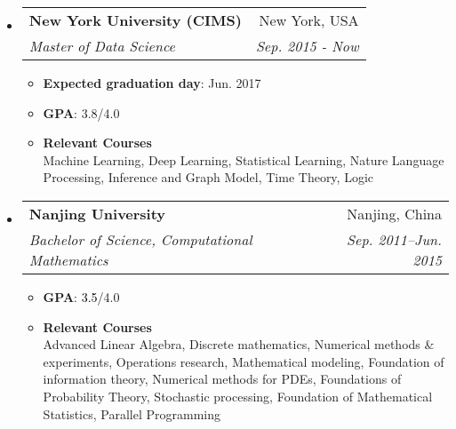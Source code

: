 \documentclass[a4paper,11pt]{article}
\makeatletter
\renewcommand{\normalsize}{\fontsize{12pt}{\baselineskip}\selectfont}
\newcommand{\ressubheading}[4]{
	\begin{tabular*}{6.5in}{l@{\extracolsep{\fill}}r}
		\textbf{#1} & #2 \\
		\textit{#3} & \textit{#4} \\
	\end{tabular*}\vspace{-6pt}}
\makeatother
\begin{document}
	\begin{itemize}
		\item
		\ressubheading{{\normalsize New York University (CIMS) }}{New York, USA}{\normalsize Master of Data Science}{Sep. 2015 - Now}
		\begin{itemize}
			\item {\bfseries Expected graduation day}: Jun. 2017
			\item {\bfseries GPA}: 3.8/4.0
			\item {\bfseries Relevant Courses}\\
			{\footnotesize
				Machine Learning, Deep Learning, Statistical Learning, Nature Language Processing, Inference and Graph Model, Time Theory, Logic
			}
		\end{itemize}
		\item
		\ressubheading{{\normalsize Nanjing University}}{Nanjing, China}{{\normalsize Bachelor of Science, Computational Mathematics}}{Sep. 2011--Jun. 2015}
		\begin{itemize}
			\item {\bfseries GPA}: \textcolor{black}{3.5}/4.0
			\item {\bfseries Relevant Courses}\\
			{ \footnotesize
				Advanced Linear Algebra, Discrete mathematics, Numerical methods \& experiments, Operations research, Mathematical modeling, Foundation of information theory, Numerical methods for PDEs, Foundations of Probability Theory, Stochastic processing, Foundation of Mathematical Statistics, Parallel Programming
			}
		\end{itemize}
	\end{itemize}
	
	
\end{document}
